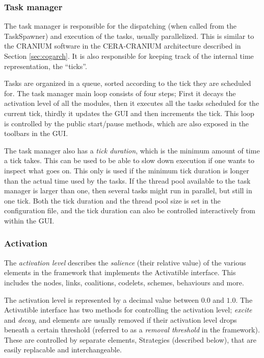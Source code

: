 \subsubsection{Task manager}
The task manager is responsible for the dispatching (when called from the TaskSpawner) and execution of the tasks, usually parallelized. This is similar to the CRANIUM software in the CERA-CRANIUM architecture described in Section \ref{sec:cogarch}. It is also responsible for keeping track of the internal time representation, the ``ticks''.

Tasks are organized in a queue, sorted according to the tick they are scheduled for. The task manager main loop consists of four steps; First it decays the activation level of all the modules, then it executes all the tasks scheduled for the current tick, thirdly it updates the GUI and then increments the tick. This loop is controlled by the public start/pause methods, which are also exposed in the toolbars in the GUI.

The task manager also has a {\em tick duration}, which is the minimum amount of time a tick takes. This can be used to be able to slow down execution if one wants to inspect what goes on. This only is used if the minimum tick duration is longer than the actual time used by the tasks. If the thread pool available to the task manager is larger than one, then several tasks might run in parallel, but still in one tick. Both the tick duration and the thread pool size is set in the configuration file, and the tick duration can also be controlled interactively from within the GUI.

\subsubsection{Activation}
The {\em activation level} describes the {\em salience} (their relative value) of the various elements in the framework that implements the Activatible interface. This includes the nodes, links, coalitions, codelets, schemes, behaviours and more.

The activation level is represented by a decimal value between $0.0$ and $1.0$. The Activatible interface has two methods for controlling the activation level; {\em excite} and {\em decay}, and elements are usually removed if their activation level drops beneath a certain threshold (referred to as a {\em removal threshold} in the framework). These are controlled by separate elements, Strategies (described below), that are easily replacable and interchangeable.

